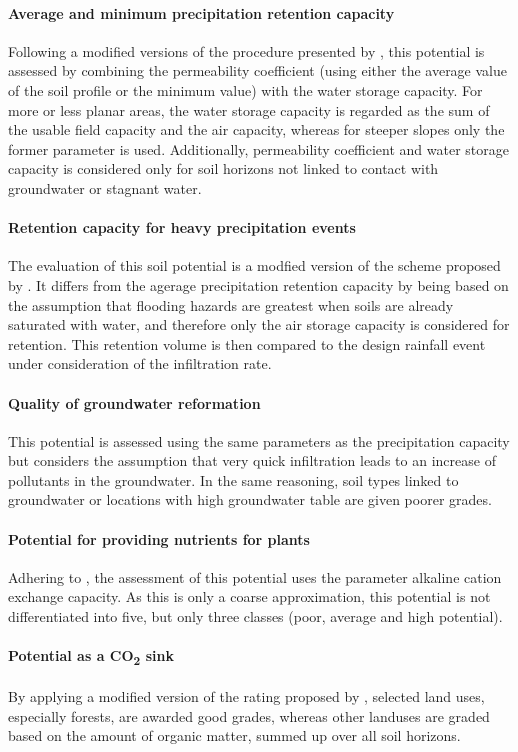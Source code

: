 \documentclass[preprint,12pt,authoryear]{elsarticle}
\begin{document}
\paragraph{Average and minimum precipitation retention capacity}
Following a modified versions of the procedure presented by \cite{BAYGLA2003}, this potential is assessed by combining the permeability coefficient (using either the average value of the soil profile or the minimum value) with the water storage capacity. For more or less planar areas, the water storage capacity is regarded as  the sum of the usable field capacity and the air capacity, whereas for steeper slopes only the former parameter is used. Additionally, permeability coefficient and water storage capacity is considered only for soil horizons not linked to contact with groundwater or stagnant water.
\paragraph{Retention capacity for heavy precipitation events}
 The evaluation of this soil potential is a modfied version of the scheme proposed by \citep{Lehmann2008}. It differs from the agerage precipitation retention capacity by being based on the assumption that flooding hazards are greatest when soils are already saturated with water, and therefore only the air storage capacity is considered for retention. This retention volume is then compared to the design rainfall event under consideration of the infiltration rate.
\paragraph{Quality of groundwater reformation}
This potential is assessed using the same parameters as the precipitation capacity but considers the assumption that very quick infiltration leads to an increase of pollutants in the groundwater. In the same reasoning, soil types linked to groundwater or locations with high groundwater table are given poorer grades.

\paragraph{Potential for providing nutrients for plants}
Adhering to \citep{Mueller2011}, the assessment of this potential uses the parameter alkaline cation exchange capacity. As this is only a coarse approximation, this potential is not differentiated into five, but only three classes (poor, average and high potential).
\paragraph{Potential as a CO\textsubscript{2} sink}
By applying a modified version of the rating proposed by \cite{Gerstenberg2005}, selected land uses, especially forests, are awarded good grades, whereas other landuses are graded based on the amount of organic matter, summed up over all soil horizons.
\end{document}
